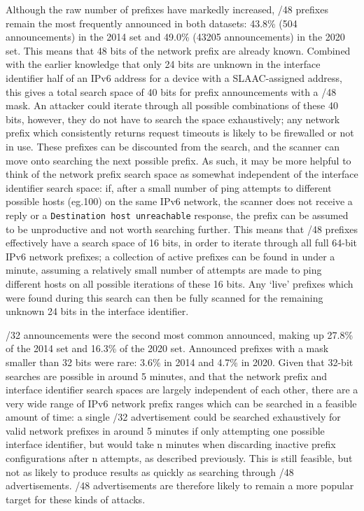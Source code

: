 \documentclass[10pt,sigconf]{acmart}
\begin{document}
Although the raw number of prefixes have markedly increased, /48 prefixes remain the most frequently announced in both datasets:
43.8\% (504 announcements) in the 2014 set and 49.0\% (43205 announcements) in the 2020 set.
This means that 48 bits of the network prefix are already known.
Combined with the earlier knowledge that only 24 bits are unknown in the interface identifier half of an IPv6 address for a device with a SLAAC-assigned address, this gives a total search space of 40 bits for prefix announcements with a /48 mask.
An attacker could iterate through all possible combinations of these 40 bits, however, they do not have to search the space exhaustively;
any network prefix which consistently returns request timeouts is likely to be firewalled or not in use.
These prefixes can be discounted from the search, and the scanner can move onto searching the next possible prefix.
As such, it may be more helpful to think of the network prefix search space as somewhat independent of the interface identifier search space:
if, after a small number of ping attempts to different possible hosts (eg.100) on the same IPv6 network, the scanner does not receive a reply or a \texttt{Destination host unreachable} response, the prefix can be assumed to be unproductive and not worth searching further.
This means that /48 prefixes effectively have a search space of 16 bits, in order to iterate through all full 64-bit IPv6 network prefixes;
a collection of active prefixes can be found in under a minute, assuming a relatively small number of attempts are made to ping different hosts on all possible iterations of these 16 bits.
Any `live' prefixes which were found during this search can then be fully scanned for the remaining unknown 24 bits in the interface identifier.

/32 announcements were the second most common announced, making up 27.8\% of the 2014 set and 16.3\% of the 2020 set.
Announced prefixes with a mask smaller than 32 bits were rare:
3.6\% in 2014 and 4.7\% in 2020.
Given that 32-bit searches are possible in around 5 minutes, and that the network prefix and interface identifier search spaces are largely independent of each other, there are a very wide range of IPv6 network prefix ranges which can be searched in a feasible amount of time:
a single /32 advertisement could be searched exhaustively for valid network prefixes in around 5 minutes if only attempting one possible interface identifier, but would take n minutes when discarding inactive prefix configurations after n attempts, as described previously.
This is still feasible, but not as likely to produce results as quickly as searching through /48 advertisements.
/48 advertisements are therefore likely to remain a more popular target for these kinds of attacks.
\end{document}
